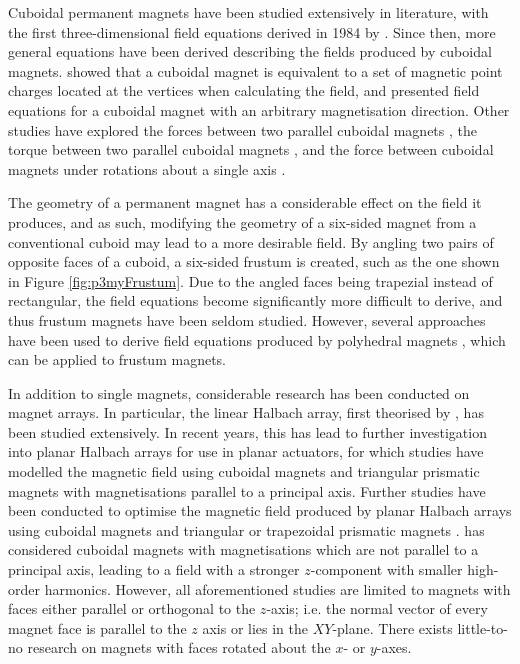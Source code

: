 Cuboidal permanent magnets have been studied extensively in literature, with the first three-dimensional field equations derived in 1984 by \textcite{Akoun1984}. Since then, more general equations have been derived describing the fields produced by cuboidal magnets. \textcite{Bancel1999} showed that a cuboidal magnet is equivalent to a set of magnetic point charges located at the vertices when calculating the field, and \textcite{Ravaud2009} presented field equations for a cuboidal magnet with an arbitrary magnetisation direction. Other studies have explored the forces between two parallel cuboidal magnets \cite{Akoun1984,Janssen2009a}, the torque between two parallel cuboidal magnets \cite{Allag2009,Janssen2011,Janssen2010}, and the force between cuboidal magnets under rotations about a single axis \cite{Dam2016}.

The geometry of a permanent magnet has a considerable effect on the field it produces, and as such, modifying the geometry of a six-sided magnet from a conventional cuboid may lead to a more desirable field. By angling two pairs of opposite faces of a cuboid, a six-sided frustum is created, such as the one shown in Figure \ref{fig:p3myFrustum}. Due to the angled faces being trapezial instead of rectangular, the field equations become significantly more difficult to derive, and thus frustum magnets have been seldom studied. However, several approaches have been used to derive field equations produced by polyhedral magnets \cite{Compter2010,Fabbri2008,Janssen2010a,Janssen2009,OConnell2020,Rubeck2013,OConnell2020a}, which can be applied to frustum magnets.

In addition to single magnets, considerable research has been conducted on magnet arrays. In particular, the linear Halbach array, first theorised by \textcite{Mallinson1973}, has been studied extensively. In recent years, this has lead to further investigation into planar Halbach arrays for use in planar actuators, for which studies have modelled the magnetic field using cuboidal magnets \cite{Boeij2006,Rovers2012} and triangular prismatic magnets \cite{Cho2001} with magnetisations parallel to a principal axis. Further studies have been conducted to optimise the magnetic field produced by planar Halbach arrays using cuboidal magnets \cite{Huang2008,Jansen2008} and triangular or trapezoidal prismatic magnets \cite{Cho2002,Peng2013}. \textcite{Min2010} has considered cuboidal magnets with magnetisations which are not parallel to a principal axis, leading to a field with a stronger \(z\)-component with smaller high-order harmonics. However, all aforementioned studies are limited to magnets with faces either parallel or orthogonal to the \(z\)-axis; i.e. the normal vector of every magnet face is parallel to the \(z\) axis or lies in the \(XY\)-plane. There exists little-to-no research on magnets with faces rotated about the \(x\)- or \(y\)-axes.

